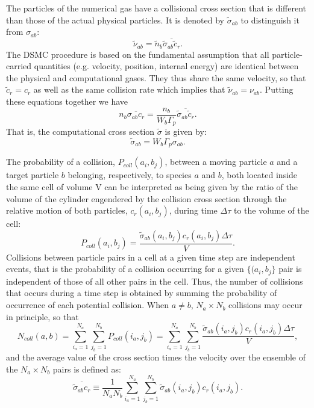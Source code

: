 \documentclass[12pt]{article}
\begin{document}
The particles of the numerical gas have a collisional cross section
that is different than those of the actual physical particles. It is
denoted by ${\tilde\sigma}_{ab}$ to distinguish it from $\sigma_{ab}$:
\begin{equation}
  \tilde{\nu}_{ab} = \tilde{n}_b \overline{\tilde{\sigma}_{ab} \tilde{c}_r}.
\end{equation}
The DSMC procedure is based on the fundamental assumption that all
particle-carried quantities (e.g. velocity, position, internal energy)
are identical between the physical and computational gases. They thus
share the same velocity, so that ${\tilde c}_r = c_r$ as well as the
same collision rate which implies that $\tilde{\nu}_{ab} =
\nu_{ab}$. Putting these equations together we have
\begin{equation}
  n_b \overline{\sigma_{ab} c_r} =
  \frac{n_b}{W_b\Gamma_p}\overline{\tilde{\sigma}_{ab} \tilde{c}_r}.
  \label{eq:balance}
\end{equation}
That is, the computational cross
section ${\tilde\sigma}$ is given by: 
\begin{equation}
{\tilde\sigma}_{ab} = W_b\Gamma_p \sigma_{ab}.
\end{equation}

The probability of a collision, $P_{coll}(a_i, b_j)$, between a moving
particle $a$ and a target particle $b$ belonging, respectively, to
species $a$ and $b$, both located inside the same cell of volume V can
be interpreted as being given by the ratio of the volume of the
cylinder engendered by the collision cross section through the
relative motion of both particles, $c_r(a_i, b_j)$, during time
$\Delta\tau$ to the volume of the cell:
\begin{equation}
  P_{coll}(a_i, b_j) = \frac{{\tilde\sigma}_{ab}(a_i, b_j)c_r(a_i, b_j)\Delta\tau}{V}.
\end{equation}
Collisions between particle pairs in a cell at a given time step are
independent events, that is the probability of a collision occurring
for a given $\{(a_i, b_j\}$ pair is independent of those of all other
pairs in the cell. Thus, the number of collisions that occurs during a
time step is obtained by summing the probability of occurrence of each
potential collision. When $a\not=b$, $N_a\times N_b$ collisions may
occur in principle, so that
\begin{equation}
N_{coll}(a, b) = \sum_{i_a=1}^{N_a}\sum_{j_b=1}^{N_b} P_{coll}(i_a, j_b) =
\sum_{i_a=1}^{N_a}\sum_{j_b=1}^{N_b}\frac{\tilde{\sigma}_{ab}(i_a, j_b)
  c_r(i_a, j_b)\Delta\tau}{V},
\end{equation}
and the average value of the cross section times the velocity over the
ensemble of the $N_a\times N_b$ pairs is defined as:
\begin{equation}
  \overline{\tilde{\sigma}_{ab} c_r}\equiv
  \frac{1}{N_a N_b} \sum_{i_a=1}^{N_a}\sum_{j_b=1}^{N_b} \tilde{\sigma}_{ab}(i_a, j_b)
  c_r(i_a, j_b).
\end{equation}
\end{document}
